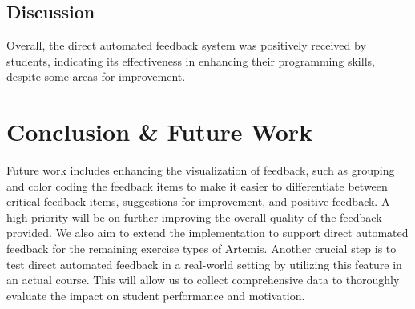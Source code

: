 \documentclass[manuscript,screen,review]{acmart}
\begin{document}




\subsection{Discussion}

Overall, the direct automated feedback system was positively received by students, indicating its effectiveness in enhancing their programming skills, despite some areas for improvement.

\section{Conclusion \& Future Work} %
\label{sec:conclusion}

% 
Future work includes enhancing the visualization of feedback, such as grouping and color coding the feedback items to make it easier to differentiate between critical feedback items, suggestions for improvement, and positive feedback.
A high priority will be on further improving the overall quality of the feedback provided. 
We also aim to extend the implementation to support direct automated feedback for the remaining exercise types of Artemis.
Another crucial step is to test direct automated feedback in a real-world setting by utilizing this feature in an actual course. 
This will allow us to collect comprehensive data to thoroughly evaluate the impact on student performance and motivation.




\end{document}
